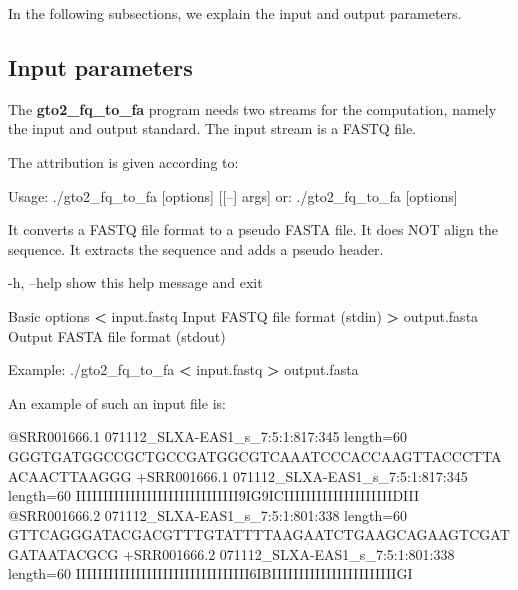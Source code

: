\documentclass[11pt,]{krantz}
\newenvironment{Shaded}{\begin{snugshade}}{\end{snugshade}}
\newcommand{\OperatorTok}[1]{\textcolor[rgb]{0.43,0.43,0.43}{\textbf{#1}}}
\newcommand{\ExtensionTok}[1]{#1}
\newcommand{\NormalTok}[1]{#1}
\begin{document}
In the following subsections, we explain the input and output
parameters.

\subsection*{Input parameters}\label{input-parameters}


The \textbf{gto2\_fq\_to\_fa} program needs two streams for the
computation, namely the input and output standard. The input stream is a
FASTQ file.

The attribution is given according to:

\begin{Shaded}
\begin{Highlighting}[]
\ExtensionTok{Usage}\NormalTok{: ./gto2_fq_to_fa [options] [[--] args]}
   \ExtensionTok{or}\NormalTok{: ./gto2_fq_to_fa [options]}

\ExtensionTok{It}\NormalTok{ converts a FASTQ file format to a pseudo FASTA file.}
\ExtensionTok{It}\NormalTok{ does NOT align the sequence.}
\ExtensionTok{It}\NormalTok{ extracts the sequence and adds a pseudo header.}

    \ExtensionTok{-h}\NormalTok{, --help            show this help message and exit}

\ExtensionTok{Basic}\NormalTok{ options}
    \OperatorTok{<} \ExtensionTok{input.fastq}\NormalTok{         Input FASTQ file format (stdin)}
    \OperatorTok{>} \ExtensionTok{output.fasta}\NormalTok{        Output FASTA file format (stdout)}

\ExtensionTok{Example}\NormalTok{: ./gto2_fq_to_fa }\OperatorTok{<}\NormalTok{ input.fastq }\OperatorTok{>}\NormalTok{ output.fasta}
\end{Highlighting}
\end{Shaded}

An example of such an input file is:

\begin{Shaded}
\begin{Highlighting}[]
\ExtensionTok{@SRR001666.1}\NormalTok{ 071112_SLXA-EAS1_s_7:5:1:817:345 length=60}
\ExtensionTok{GGGTGATGGCCGCTGCCGATGGCGTCAAATCCCACCAAGTTACCCTTAACAACTTAAGGG}
\ExtensionTok{+SRR001666.1}\NormalTok{ 071112_SLXA-EAS1_s_7:5:1:817:345 length=60}
\ExtensionTok{IIIIIIIIIIIIIIIIIIIIIIIIIIIIII9IG9ICIIIIIIIIIIIIIIIIIIIIDIII}
\ExtensionTok{@SRR001666.2}\NormalTok{ 071112_SLXA-EAS1_s_7:5:1:801:338 length=60}
\ExtensionTok{GTTCAGGGATACGACGTTTGTATTTTAAGAATCTGAAGCAGAAGTCGATGATAATACGCG}
\ExtensionTok{+SRR001666.2}\NormalTok{ 071112_SLXA-EAS1_s_7:5:1:801:338 length=60}
\ExtensionTok{IIIIIIIIIIIIIIIIIIIIIIIIIIIIIIII6IBIIIIIIIIIIIIIIIIIIIIIIIGI}
\end{Highlighting}
\end{Shaded}
\end{document}
